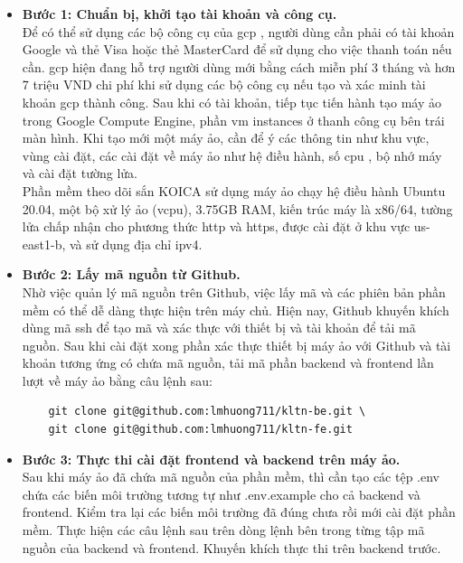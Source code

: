 \documentclass[./../main.tex]{subfiles}
\begin{document}
\begin{itemize}
    \item \textbf{Bước 1: Chuẩn bị, khởi tạo tài khoản và công cụ.}\\
    Để có thể sử dụng các bộ công cụ của \acrshort{gcp} , người dùng cần phải có tài khoản Google và thẻ Visa hoặc thẻ MasterCard để sử dụng cho việc thanh toán nếu cần. \acrshort{gcp} hiện đang hỗ trợ người dùng mới bằng cách miễn phí 3 tháng và hơn 7 triệu VND chi phí khi sử dụng các bộ công cụ nếu tạo và xác minh tài khoản \acrshort{gcp} thành công. Sau khi có tài khoản, tiếp tục tiến hành tạo máy ảo trong Google Compute Engine, phần \acrshort{vm} instances ở thanh công cụ bên trái màn hình. Khi tạo mới một máy ảo, cần để ý các thông tin như khu vực, vùng cài đặt, các cài đặt về máy ảo như hệ điều hành, số \acrshort{cpu} , bộ nhớ máy và cài đặt tường lửa.\\
    Phần mềm theo dõi sắn KOICA sử dụng máy ảo chạy hệ điều hành Ubuntu 20.04, một bộ xử lý ảo (\acrshort{vcpu}), 3.75GB RAM, kiến trúc máy là x86/64, tường lửa chấp nhận cho phương thức \acrshort{http} và \acrshort{https}, được cài đặt ở khu vực us-east1-b, và sử dụng địa chỉ \acrshort{ipv4}.
    \item \textbf{Bước 2: Lấy mã nguồn từ Github.}\\
    Nhờ việc quản lý mã nguồn trên Github, việc lấy mã và các phiên bản phần mềm có thể dễ dàng thực hiện trên máy chủ. Hiện nay, Github khuyến khích dùng mã \acrshort{ssh} để tạo mã và xác thực với thiết bị và tài khoản để tải mã nguồn. Sau khi cài đặt xong phần xác thực thiết bị máy ảo với Github và tài khoản tương ứng có chứa mã nguồn, tải mã phần backend và frontend lần lượt về máy ảo bằng câu lệnh sau:\\
    \begin{verbatim}
    git clone git@github.com:lmhuong711/kltn-be.git \
    git clone git@github.com:lmhuong711/kltn-fe.git
    \end{verbatim}
    \item \textbf{Bước 3: Thực thi cài đặt frontend và backend trên máy ảo.}\\
    Sau khi máy ảo đã chứa mã nguồn của phần mềm, thì cần tạo các tệp .env chứa các biến môi trường tương tự như .env.example cho cả backend và frontend. Kiểm tra lại các biến môi trường đã đúng chưa rồi mới cài đặt phần mềm. Thực hiện các câu lệnh sau trên dòng lệnh bên trong từng tập mã nguồn của backend và frontend. Khuyến khích thực thi trên backend trước.
    \begin{verbatim}

\end{verbatim}
\end{itemize}
\end{document}
